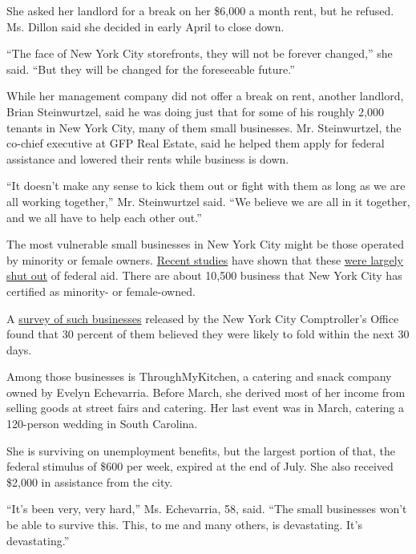 She asked her landlord for a break on her \$6,000 a month rent, but he
refused. Ms. Dillon said she decided in early April to close down.

``The face of New York City storefronts, they will not be forever
changed,'' she said. ``But they will be changed for the foreseeable
future.''

While her management company did not offer a break on rent, another
landlord, Brian Steinwurtzel, said he was doing just that for some of
his roughly 2,000 tenants in New York City, many of them small
businesses. Mr. Steinwurtzel, the co-chief executive at GFP Real Estate,
said he helped them apply for federal assistance and lowered their rents
while business is down.

``It doesn't make any sense to kick them out or fight with them as long
as we are all working together,'' Mr. Steinwurtzel said. ``We believe we
are all in it together, and we all have to help each other out.''

The most vulnerable small businesses in New York City might be those
operated by minority or female owners.
\href{https://www.nytimes.com/2020/05/18/business/minority-businesses-coronavirus-loans.html}{Recent
studies} have shown that these
\href{https://www.nytimes.com/2020/04/10/business/minority-business-coronavirus-loans.html}{were
largely shut out} of federal aid. There are about 10,500 business that
New York City has certified as minority- or female-owned.

A
\href{https://comptroller.nyc.gov/newsroom/comptroller-stringer-analysis-85-percent-of-m-wbes-report-they-will-be-out-of-business-in-six-months-due-to-economic-distress-of-covid-19-pandemic/}{survey
of such businesses} released by the New York City Comptroller's Office
found that 30 percent of them believed they were likely to fold within
the next 30 days.

Among those businesses is ThroughMyKitchen, a catering and snack company
owned by Evelyn Echevarria. Before March, she derived most of her income
from selling goods at street fairs and catering. Her last event was in
March, catering a 120-person wedding in South Carolina.

She is surviving on unemployment benefits, but the largest portion of
that, the federal stimulus of \$600 per week, expired at the end of
July. She also received \$2,000 in assistance from the city.

``It's been very, very hard,'' Ms. Echevarria, 58, said. ``The small
businesses won't be able to survive this. This, to me and many others,
is devastating. It's devastating.''

